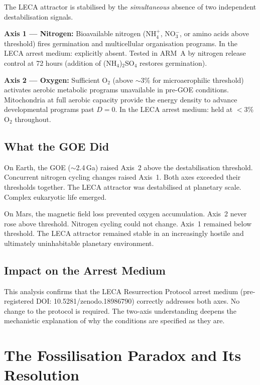 \documentclass[11pt, a4paper]{article}
\begin{document}
The LECA attractor is stabilised by the
\textit{simultaneous} absence of two independent
destabilisation signals.

\textbf{Axis 1 --- Nitrogen:}
Bioavailable nitrogen (NH$_4^+$, NO$_3^-$, or
amino acids above threshold) fires germination
and multicellular organisation programs.
In the LECA arrest medium: explicitly absent.
Tested in ARM~A by nitrogen release control at
72 hours (addition of (NH$_4$)$_2$SO$_4$
restores germination).

\textbf{Axis 2 --- Oxygen:}
Sufficient O$_2$ (above $\sim$3\% for microaerophilic
threshold) activates aerobic metabolic programs
unavailable in pre-GOE conditions.
Mitochondria at full aerobic capacity provide
the energy density to advance developmental
programs past $D{=}0$.
In the LECA arrest medium: held at $<$3\% O$_2$
throughout.

\subsection{What the GOE Did}

On Earth, the GOE ($\sim$2.4\,Ga) raised Axis~2
above the destabilisation threshold.
Concurrent nitrogen cycling changes raised Axis~1.
Both axes exceeded their thresholds together.
The LECA attractor was destabilised at
planetary scale.
Complex eukaryotic life emerged.

On Mars, the magnetic field loss prevented
oxygen accumulation.
Axis~2 never rose above threshold.
Nitrogen cycling could not change.
Axis~1 remained below threshold.
The LECA attractor remained stable in an
increasingly hostile and ultimately uninhabitable
planetary environment.

\subsection{Impact on the Arrest Medium}

This analysis confirms that the LECA Resurrection
Protocol arrest medium (pre-registered DOI:
10.5281/zenodo.18986790) correctly addresses both
axes.
No change to the protocol is required.
The two-axis understanding deepens the
mechanistic explanation of why the conditions are
specified as they are.

\section{The Fossilisation Paradox and Its Resolution}
\end{document}
